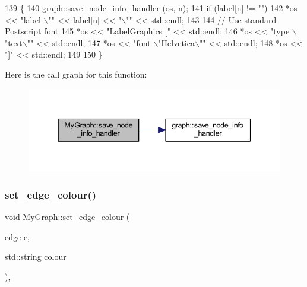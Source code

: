 \begin{DoxyCode}
139 \{
140     \mbox{\hyperlink{classgraph_a994f87e1b7f1f723cf03e54e2eb7a99d}{graph::save\_node\_info\_handler}} (os, n);
141     \textcolor{keywordflow}{if} (\mbox{\hyperlink{class_my_graph_a5c9923e2b43cb5a3139715acc34b8ca8}{label}}[n] != \textcolor{stringliteral}{""})    
142         *os << \textcolor{stringliteral}{"label \(\backslash\)""} << \mbox{\hyperlink{class_my_graph_a5c9923e2b43cb5a3139715acc34b8ca8}{label}}[n] << \textcolor{stringliteral}{"\(\backslash\)""} << std::endl;
143 
144     \textcolor{comment}{// Use standard Postscript font}
145     *os << \textcolor{stringliteral}{"LabelGraphics ["} << std::endl;
146     *os << \textcolor{stringliteral}{"type \(\backslash\)"text\(\backslash\)""} << std::endl;
147     *os << \textcolor{stringliteral}{"font \(\backslash\)"Helvetica\(\backslash\)""} << std::endl;
148     *os << \textcolor{stringliteral}{"]"} << std::endl;
149 
150 \}
\end{DoxyCode}
Here is the call graph for this function\+:
\nopagebreak
\begin{figure}[H]
\begin{center}
\leavevmode
\includegraphics[width=337pt]{class_my_graph_ad5f4b3ce70135723fe08a301d20c4a8a_cgraph}
\end{center}
\end{figure}
\mbox{\label{class_my_graph_a865b0e9fd7f74cd40f23230733746a93}} 
\subsubsection{\texorpdfstring{set\+\_\+edge\+\_\+colour()}{set\_edge\_colour()}}
{\footnotesize\ttfamily void My\+Graph\+::set\+\_\+edge\+\_\+colour (\begin{DoxyParamCaption}\item[{\mbox{\hyperlink{classedge}{edge}}}]{e,  }\item[{std\+::string}]{colour }\end{DoxyParamCaption})\hspace{0.3cm}{\ttfamily [inline]}, {\ttfamily [inherited]}}



